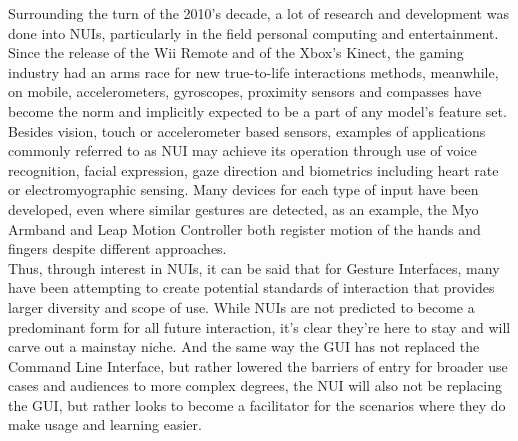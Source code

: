     Surrounding the turn of the 2010’s decade, a lot of research and development was done into NUIs, particularly in the field personal computing and entertainment. Since the release of the Wii Remote and of the Xbox’s Kinect, the gaming industry had an arms race for new true-to-life interactions methods\cite{ROCCETTI2012}, meanwhile, on mobile, accelerometers, gyroscopes, proximity sensors and compasses have become the norm and implicitly expected to be a part of any model’s feature set. Besides vision, touch or accelerometer based sensors, examples of applications commonly referred to as NUI may achieve its operation through use of voice recognition, facial expression, gaze direction and biometrics including heart rate or electromyographic sensing. Many devices for each type of input have been developed, even where similar gestures are detected, as an example, the Myo Armband and Leap Motion Controller both register motion of the hands and fingers despite different approaches.\\
    Thus, through interest in NUIs, it can be said that for Gesture Interfaces, many have been attempting to create potential standards of interaction that provides larger diversity and scope of use. While NUIs are not predicted to become a predominant form for all future interaction, it's clear they're here to stay and will carve out a mainstay niche. And the same way the GUI has not replaced the Command Line Interface, but rather lowered the barriers of entry for broader use cases and audiences to more complex degrees, the NUI will also not be replacing the GUI, but rather looks to become a facilitator for the scenarios where they do make usage and learning easier.

